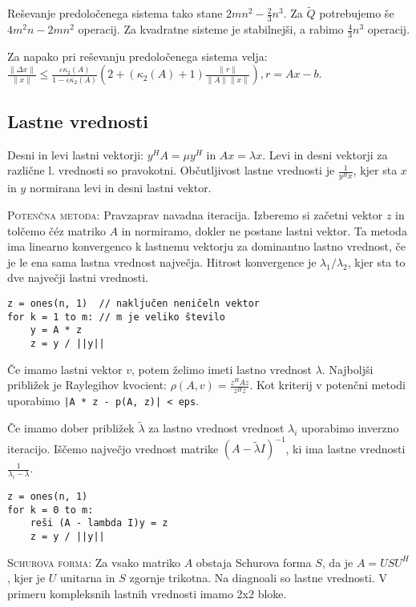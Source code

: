 \documentclass[a4paper,10pt]{article}
\theoremstyle{definition}
\begin{document}
Reševanje predoločenega sistema tako stane $2mn^2 - \frac23n^3$. Za $\tilde{Q}$
potrebujemo še $4m^2n-2mn^2$ operacij. Za kvadratne sisteme je stabilnejši, a
rabimo $\frac43n^3$ operacij.

Za napako pri reševanju predoločenega sistema velja:
$\frac{\|\Delta x\|}{\|x\|} \leq \frac{\varepsilon\kappa_2(A)}{1-\varepsilon\kappa_2(A)}
\left(2+(\kappa_2(A) + 1)\frac{\|r\|}{\|A\|\|x\|} \right), r = Ax -b$.

\subsection*{Lastne vrednosti}
Desni in levi lastni vektorji: $y^HA = \mu y^H$ in $Ax = \lambda x$. Levi in
desni vektorji za različne l. vrednosti so pravokotni. Občutljivost lastne
vrednosti je $\frac{1}{y^Hx}$, kjer sta $x$ in $y$ normirana levi in desni
lastni vektor.

\textsc{Potenčna metoda:} Pravzaprav navadna iteracija. Izberemo si začetni
vektor $z$ in tolčemo č\'{e}z matriko $A$ in normiramo, dokler ne postane lastni vektor. Ta
metoda ima linearno konvergenco k lastnemu vektorju za dominantno lastno
vrednost, če je le ena sama lastna vrednost največja.
Hitrost konvergence je $\lambda_1 / \lambda_2$, kjer sta to dve
največji lastni vrednosti.
\scriptsize
\begin{verbatim}
z = ones(n, 1)  // naključen neničeln vektor
for k = 1 to m: // m je veliko število
    y = A * z
    z = y / ||y||
\end{verbatim}
\normalsize
Če imamo lastni vektor $v$, potem želimo imeti lastno vrednost $\lambda$.
Najboljši približek je Raylegihov kvocient: $\rho(A, v) = \frac{z^H\!\!Az}{z^Hz}$.
Kot kriterij v potenčni metodi uporabimo \verb'|A * z - p(A, z)| < eps'.

Če imamo dober približek $\tilde{\lambda}$ za lastno vrednost vrednost
$\lambda_i$ uporabimo inverzno iteracijo. Iščemo največjo vrednost matrike
$(A-\tilde{\lambda}I)^{-1}$, ki
ima lastne vrednosti $\frac{1}{\lambda_i - \lambda}$.
\scriptsize
\begin{verbatim}
z = ones(n, 1)
for k = 0 to m:
    reši (A - lambda I)y = z
    z = y / ||y||
\end{verbatim}
\normalsize

\textsc{Schurova forma:} Za vsako matriko $A$ obstaja Schurova forma $S$, da je $A = USU^H$,
kjer je $U$ unitarna in $S$ zgornje trikotna. Na diagnoali so lastne vrednosti.
V primeru kompleksnih lastnih vrednosti imamo 2x2 bloke.
\end{document}
